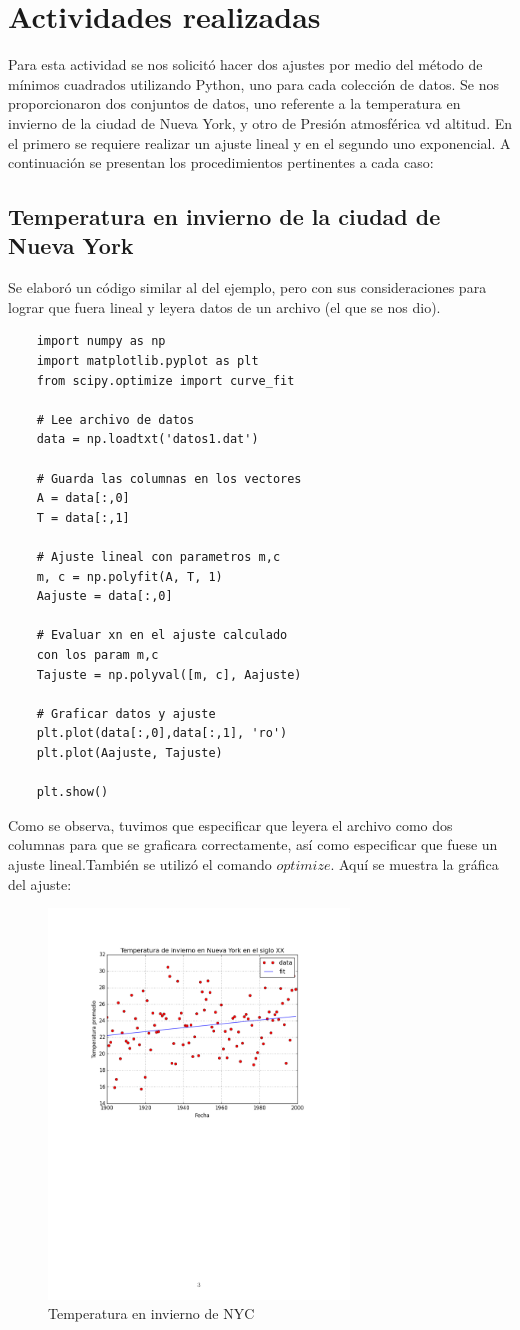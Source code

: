 \documentclass[12 pt,twocolumn]{article}
\begin{document}
\section{\small Actividades realizadas}
Para esta actividad se nos solicitó  hacer dos ajustes por medio del método de mínimos cuadrados utilizando Python, uno para cada colección de datos.
Se nos proporcionaron dos conjuntos de datos, uno referente a la temperatura en invierno de la ciudad de Nueva York, y otro de Presión atmosférica vd altitud.
En el primero se requiere realizar un ajuste lineal y en el segundo uno exponencial. A continuación se presentan los procedimientos pertinentes a cada caso:
\subsection{\small Temperatura en invierno de la ciudad de Nueva York}
Se elaboró un código similar al del ejemplo, pero con sus consideraciones para lograr que fuera lineal y leyera datos de un archivo (el que se nos dio).
\begin{verbatim}
	import numpy as np
	import matplotlib.pyplot as plt
	from scipy.optimize import curve_fit
	
	# Lee archivo de datos
	data = np.loadtxt('datos1.dat')
	
	# Guarda las columnas en los vectores
	A = data[:,0]
	T = data[:,1]
	
	# Ajuste lineal con parametros m,c
	m, c = np.polyfit(A, T, 1)
	Aajuste = data[:,0]
	
	# Evaluar xn en el ajuste calculado 
	con los param m,c
	Tajuste = np.polyval([m, c], Aajuste)
	
	# Graficar datos y ajuste
	plt.plot(data[:,0],data[:,1], 'ro')
	plt.plot(Aajuste, Tajuste)
	
	plt.show()
	\end{verbatim}
	Como se observa, tuvimos que especificar que leyera el archivo como dos columnas para que se graficara correctamente, así como especificar que fuese un ajuste lineal.También se utilizó el comando $optimize$.
	Aquí se muestra la gráfica del ajuste:
	\begin{figure}[H]
		\centering
		\includegraphics[width=8cm]{ajuste1.png}
		\caption{Temperatura en invierno de NYC}
	\end{figure}
\end{document}
